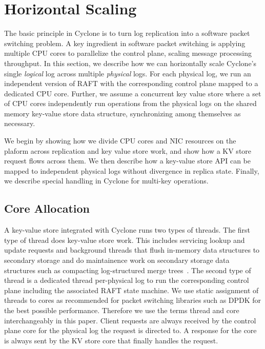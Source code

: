 \documentclass[10pt, preprint, nonatbib]{sigplanconf}
\begin{document}
\section{Horizontal Scaling}
\label{sec:horizontal}
The basic principle in Cyclone is to turn log replication into a software packet
switching problem. A key ingredient in software packet switching is applying
multiple CPU cores to parallelize the control plane, scaling message processing
throughput. In this section, we describe how we can horizontally scale Cyclone's
single \emph{logical} log across multiple \emph{physical} logs. For each
physical log, we run an independent version of RAFT with the corresponding
control plane mapped to a dedicated CPU core. Further, we assume a concurrent
key value store where a set of CPU cores independently run operations from the
physical logs on the shared memory key-value store data structure, synchronizing
among themselves as necessary.

We begin by showing how we divide CPU cores and NIC resources on the plaform across
replication and key value store work, and show how a KV store request flows
across them.  We then describe how a key-value store API can be mapped to
independent physical logs without divergence in replica state. Finally, we
describe special handling in Cyclone for multi-key operations.

\subsection{Core Allocation}
A key-value store integrated with Cyclone runs two types of threads. The first
type of thread does key-value store work. This includes servicing lookup and
update requests and background threads that flush in-memory data structures to
secondary storage and do maintainence work on secondary storage data structures
such as compacting log-structured merge trees~\cite{lsmtree}. The second type of
thread is a dedicated thread per-physical log to run the corresponding control
plane including the associated RAFT state machine. We use static assignment of
threads to cores as recommended for packet switching libraries such as DPDK for
the best possible performance. Therefore we use the terms thread and core
interchangeably in this paper. Client requests are always received by the
control plane core for the physical log the request is directed to. A response
for the core is always sent by the KV store core that finally handles the
request.
\end{document}
